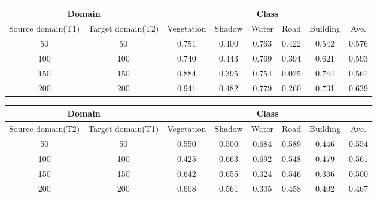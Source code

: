 \documentclass{article}
\begin{document}
\begin{table}[]
\begin{center}
\begin{tabular}{cc|ccccc|c}
\toprule
\multicolumn{2}{c|}{Domain} & \multicolumn{6}{c}{Class}\\
\midrule
 Source domain(T1) & Target domain(T2) & Vegetation & Shadow & Water & Road & Building & Ave.  \\
 \midrule
 50            & 50            &   0.751    &  0.400 & 0.763 & 0.422& 0.542    & 0.576 \\
 100           & 100           &   0.740    &  0.443 & 0.769 & 0.394& 0.621    & 0.593 \\
 150           & 150           &   0.884    &  0.395 & 0.754 & 0.025& 0.744    & 0.561 \\
 200           & 200           &   0.941    &  0.482 & 0.779 & 0.260& 0.731    & 0.639 \\
 \bottomrule
\end{tabular}
\end{center}
\end{table}

\begin{table}[]
\begin{center}
\begin{tabular}{cc|ccccc|c}
\toprule
\multicolumn{2}{c|}{Domain} & \multicolumn{6}{c}{Class}\\
\midrule
 Source domain(T2) & Target domain(T1) & Vegetation & Shadow & Water & Road & Building & Ave.  \\
 \midrule
 50            & 50            &   0.550    &  0.500 & 0.684 & 0.589 & 0.446 & 0.554 \\
 100           & 100           &   0.425    &  0.663 & 0.692 & 0.548 & 0.479 & 0.561 \\
 150           & 150           &   0.642    &  0.655 & 0.324 & 0.546 & 0.336 & 0.500 \\
 200           & 200           &   0.608    &  0.561 & 0.305 & 0.458 & 0.402 & 0.467 \\
 \bottomrule
\end{tabular}
\end{center}
\end{table}
\end{document}
